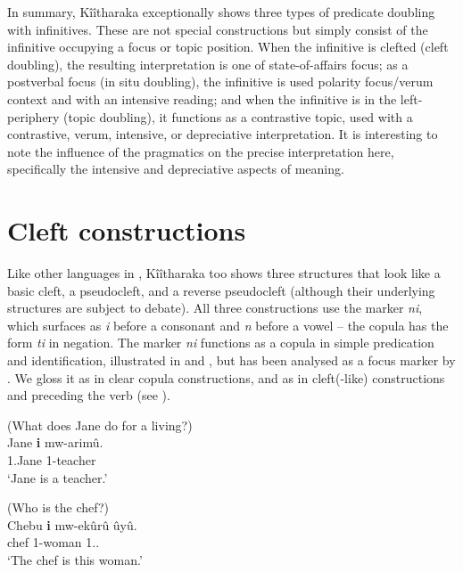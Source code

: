 \documentclass[output=paper]{langscibook}
\begin{document}
\z


In summary, Kîîtharaka exceptionally shows three types of predicate doubling with infinitives. These are not special constructions but simply consist of the infinitive occupying a focus or topic position. When the infinitive is clefted (cleft doubling), the resulting interpretation is one of state-of-affairs focus; as a postverbal focus (in situ doubling), the infinitive is used polarity focus/verum context and with an intensive reading; and when the infinitive is in the left-periphery (topic doubling), it functions as a contrastive topic, used with a contrastive, verum, intensive, or depreciative interpretation. It is interesting to note the influence of the pragmatics on the precise interpretation here, specifically the intensive and depreciative aspects of meaning.

\section{Cleft constructions}
\label{kitcleft}

Like other languages in \citet{langsci-current-book}, Kîîtharaka too shows three structures that look like a basic cleft, a pseudocleft, and a reverse pseudocleft (although their underlying structures are subject to debate). All three constructions use the marker \textit{ni}, which surfaces as \textit{i} before a consonant and \textit{n} before a vowel -- the copula has the form \textit{ti} in negation. The marker \textit{ni} functions as a copula in simple predication and identification, illustrated in  and , but has been analysed as a focus marker by \citet{AbelsMuriungi2008}. We gloss it as \COP{} in clear copula constructions, and as \FOC{} in cleft(-like) constructions and preceding the verb (see ).

\ea
\label{bkm:Ref111624670}
(What does Jane do for a living?)\\
\gll
Jane \textbf{i} mw-arimû.\\
1.Jane \COP{} 1-teacher\\
\glt
‘Jane is a teacher.’ \jambox*{[predicational]}

\z

\ea
\label{bkm:Ref111624671}
(Who is the chef?)\\
\gll
Chebu \textbf{i} mw-ekûrû  ûyû.\\
chef \COP{} 1-woman  1.\DEM.\PROX{}\\
\glt
‘The chef is this woman.’ \jambox*{[specificational]}
\end{document}
